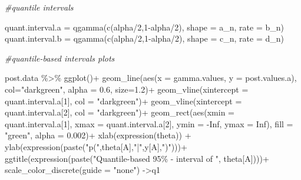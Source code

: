\documentclass[
  11pt,
]{article}
\newenvironment{Shaded}{\begin{snugshade}}{\end{snugshade}}
\newcommand{\AttributeTok}[1]{\textcolor[rgb]{0.77,0.63,0.00}{#1}}
\newcommand{\CommentTok}[1]{\textcolor[rgb]{0.56,0.35,0.01}{\textit{#1}}}
\newcommand{\ConstantTok}[1]{\textcolor[rgb]{0.00,0.00,0.00}{#1}}
\newcommand{\DecValTok}[1]{\textcolor[rgb]{0.00,0.00,0.81}{#1}}
\newcommand{\FloatTok}[1]{\textcolor[rgb]{0.00,0.00,0.81}{#1}}
\newcommand{\FunctionTok}[1]{\textcolor[rgb]{0.00,0.00,0.00}{#1}}
\newcommand{\NormalTok}[1]{#1}
\newcommand{\OtherTok}[1]{\textcolor[rgb]{0.56,0.35,0.01}{#1}}
\newcommand{\SpecialCharTok}[1]{\textcolor[rgb]{0.00,0.00,0.00}{#1}}
\newcommand{\StringTok}[1]{\textcolor[rgb]{0.31,0.60,0.02}{#1}}
\begin{document}
\begin{Shaded}
\begin{Highlighting}[]
\CommentTok{\#quantile intervals}

\NormalTok{quant.interval.a }\OtherTok{=} \FunctionTok{qgamma}\NormalTok{(}\FunctionTok{c}\NormalTok{(alpha}\SpecialCharTok{/}\DecValTok{2}\NormalTok{,}\DecValTok{1}\SpecialCharTok{{-}}\NormalTok{alpha}\SpecialCharTok{/}\DecValTok{2}\NormalTok{), }\AttributeTok{shape =}\NormalTok{ a\_n, }\AttributeTok{rate =}\NormalTok{ b\_n)}
\NormalTok{quant.interval.b }\OtherTok{=} \FunctionTok{qgamma}\NormalTok{(}\FunctionTok{c}\NormalTok{(alpha}\SpecialCharTok{/}\DecValTok{2}\NormalTok{,}\DecValTok{1}\SpecialCharTok{{-}}\NormalTok{alpha}\SpecialCharTok{/}\DecValTok{2}\NormalTok{), }\AttributeTok{shape =}\NormalTok{ c\_n, }\AttributeTok{rate =}\NormalTok{ d\_n)}

\CommentTok{\#quantile{-}based intervals plots}

\NormalTok{post.data }\SpecialCharTok{\%\textgreater{}\%} \FunctionTok{ggplot}\NormalTok{()}\SpecialCharTok{+}
  \FunctionTok{geom\_line}\NormalTok{(}\FunctionTok{aes}\NormalTok{(}\AttributeTok{x =}\NormalTok{ gamma.values, }\AttributeTok{y =}\NormalTok{ post.values.a), }\AttributeTok{col=}\StringTok{"darkgreen"}\NormalTok{, }\AttributeTok{alpha =} \FloatTok{0.6}\NormalTok{, }\AttributeTok{size=}\FloatTok{1.2}\NormalTok{)}\SpecialCharTok{+}
  \FunctionTok{geom\_vline}\NormalTok{(}\AttributeTok{xintercept =}\NormalTok{ quant.interval.a[}\DecValTok{1}\NormalTok{], }\AttributeTok{col =} \StringTok{"darkgreen"}\NormalTok{)}\SpecialCharTok{+}
  \FunctionTok{geom\_vline}\NormalTok{(}\AttributeTok{xintercept =}\NormalTok{ quant.interval.a[}\DecValTok{2}\NormalTok{], }\AttributeTok{col =} \StringTok{"darkgreen"}\NormalTok{)}\SpecialCharTok{+}
  \FunctionTok{geom\_rect}\NormalTok{(}\FunctionTok{aes}\NormalTok{(}\AttributeTok{xmin =}\NormalTok{ quant.interval.a[}\DecValTok{1}\NormalTok{], }\AttributeTok{xmax =}\NormalTok{ quant.interval.a[}\DecValTok{2}\NormalTok{], }\AttributeTok{ymin =} \SpecialCharTok{{-}}\ConstantTok{Inf}\NormalTok{, }\AttributeTok{ymax =} \ConstantTok{Inf}\NormalTok{), }\AttributeTok{fill =} \StringTok{"green"}\NormalTok{, }\AttributeTok{alpha =} \FloatTok{0.002}\NormalTok{)}\SpecialCharTok{+}
  \FunctionTok{xlab}\NormalTok{(}\FunctionTok{expression}\NormalTok{(theta)) }\SpecialCharTok{+}
  \FunctionTok{ylab}\NormalTok{(}\FunctionTok{expression}\NormalTok{(}\FunctionTok{paste}\NormalTok{(}\StringTok{"p("}\NormalTok{,theta[A],}\StringTok{"|"}\NormalTok{,y[A],}\StringTok{")"}\NormalTok{)))}\SpecialCharTok{+}
  \FunctionTok{ggtitle}\NormalTok{(}\FunctionTok{expression}\NormalTok{(}\FunctionTok{paste}\NormalTok{(}\StringTok{"Quantile{-}based 95\% {-} interval of "}\NormalTok{, theta[A])))}\SpecialCharTok{+}
  \FunctionTok{scale\_color\_discrete}\NormalTok{(}\AttributeTok{guide =} \StringTok{"none"}\NormalTok{) }\OtherTok{{-}\textgreater{}}\NormalTok{q1}


\end{Highlighting}
\end{Shaded}
\end{document}
